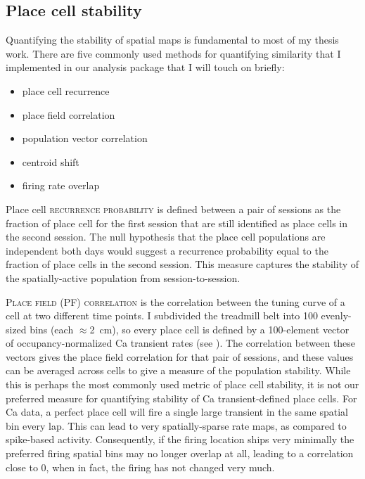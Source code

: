 \subsection{Place cell stability}
\label{sec:intro:techniques:stability}
Quantifying the stability of spatial maps is fundamental to most of my thesis work.
There are five commonly used methods for quantifying similarity that I implemented in our analysis package that I will touch on briefly:
\begin{itemize}
	\item{place cell recurrence}
	\item{place field correlation}
	\item{population vector correlation}
	\item{centroid shift}
	\item{firing rate overlap}
\end{itemize}

Place cell \textsc{recurrence probability} is defined between a pair of sessions as the fraction of place cell for the first session that are still identified as place cells in the second session. The null hypothesis that the place cell populations are independent both days would suggest a recurrence probability equal to the fraction of place cells in the second session. This measure captures the stability of the spatially-active population from session-to-session.

\textsc{Place field (PF) correlation} is the correlation between the tuning curve of a cell at two different time points. I subdivided the treadmill belt into 100 evenly-sized bins (each $\approx$2~cm), so every place cell is defined by a 100-element vector of occupancy-normalized Ca transient rates (see ). The correlation between these vectors gives the place field correlation for that pair of sessions, and these values can be averaged across cells to give a measure of the population stability.
While this is perhaps the most commonly used metric of place cell stability, it is not our preferred measure for quantifying stability of Ca transient-defined place cells.
For Ca data, a perfect place cell will fire a single large transient in the same spatial bin every lap.
This can lead to very spatially-sparse rate maps, as compared to spike-based activity.
Consequently, if the firing location ships very minimally the preferred firing spatial bins may no longer overlap at all, leading to a correlation close to 0, when in fact, the firing has not changed very much.


